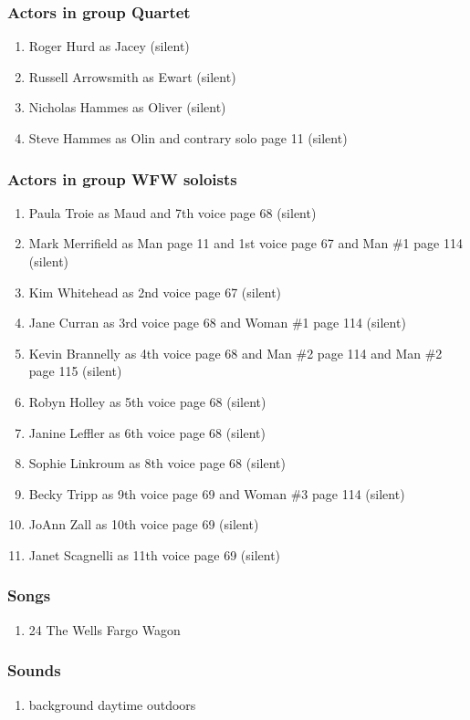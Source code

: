 \subsubsection{Actors in group Quartet}
\begin{enumerate}
\item Roger Hurd as Jacey (silent)
\item Russell Arrowsmith as Ewart (silent)
\item Nicholas Hammes as Oliver (silent)
\item Steve Hammes as Olin and contrary solo page 11 (silent)
\end{enumerate}
\subsubsection{Actors in group WFW soloists}
\begin{enumerate}
\item Paula Troie as Maud and 7th voice page 68 (silent)
\item Mark Merrifield as Man page 11 and 1st voice page 67 and Man \#1 page 114 (silent)
\item Kim Whitehead as 2nd voice page 67 (silent)
\item Jane Curran as 3rd voice page 68 and Woman \#1 page 114 (silent)
\item Kevin Brannelly as 4th voice page 68 and Man \#2 page 114 and Man \#2 page 115 (silent)
\item Robyn Holley as 5th voice page 68 (silent)
\item Janine Leffler as 6th voice page 68 (silent)
\item Sophie Linkroum as 8th voice page 68 (silent)
\item Becky Tripp as 9th voice page 69 and Woman \#3 page 114 (silent)
\item JoAnn Zall as 10th voice page 69 (silent)
\item Janet Scagnelli as 11th voice page 69 (silent)
\end{enumerate}

\subsubsection{Songs}
\begin{enumerate}
\item 24 The Wells Fargo Wagon
\end{enumerate}\subsubsection{Sounds}
\begin{enumerate}
\item background daytime outdoors
\end{enumerate}
